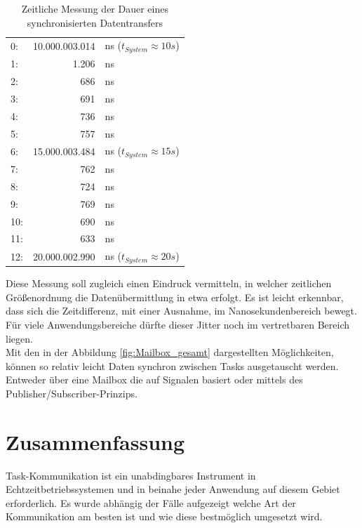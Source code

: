 \documentclass{llncs}
\begin{document}
\begin{table}[h]
	\centering %
	\def\arraystretch{1.2} %
	\setlength{\tabcolsep}{0.5em} %
	\begin{tabular}[h]{|lrl|}
		\hline
		0: & 10.000.003.014 & ns ($t_{System}\approx 10 s$) \\
		1: & 1.206 & ns \\
		2: & 686 & ns \\
		3: & 691 & ns \\
		4: & 736 & ns \\
		5: & 757 & ns \\
		6: & 15.000.003.484 & ns ($t_{System}\approx 15 s$) \\
		7: & 762 & ns \\
		8: & 724 & ns \\
		9: & 769 & ns \\
		10: & 690 & ns \\
		11: & 633 & ns \\
		12: & 20.000.002.990 & ns ($t_{System}\approx 20 s$) \\
		\hline
	\end{tabular}%
	\caption{\label{tab:SyncDaten} Zeitliche Messung der Dauer eines synchronisierten Datentransfers}
\end{table}
Diese Messung soll zugleich einen Eindruck vermitteln, in welcher zeitlichen Größenordnung die Datenübermittlung in etwa erfolgt. Es ist leicht erkennbar, dass sich die Zeitdifferenz, mit einer Ausnahme, im Nanosekundenbereich bewegt. Für viele Anwendungsbereiche dürfte dieser Jitter noch im vertretbaren Bereich liegen.\\

Mit den in der Abbildung \ref{fig:Mailbox_gesamt} dargestellten Möglichkeiten, können so relativ leicht Daten synchron zwischen Tasks ausgetauscht werden. Entweder über eine Mailbox die auf Signalen basiert oder mittels des Publisher/Subscriber-Prinzips.

\section{Zusammenfassung}
Task-Kommunikation ist ein unabdingbares Instrument in Echtzeitbetriebssystemen und in beinahe jeder Anwendung auf diesem Gebiet erforderlich. Es wurde abhängig der Fälle aufgezeigt welche Art der Kommunikation am besten ist und wie diese bestmöglich umgesetzt wird.\\
\end{document}
